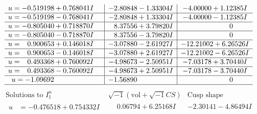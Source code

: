\documentclass[1p]{elsarticle_modified}
\theoremstyle{definition}
\newcommand{\I}{\sqrt{-1}}
\begin{document}
$$\begin{array}{c|c|c}
\begin{aligned}
u &= -0.519198 + 0.768041 I\end{aligned}
 & -2.80848 - 1.33304 I & -4.00000 + 1.12385 I \\ \hline\begin{aligned}
u &= -0.519198 - 0.768041 I\end{aligned}
 & -2.80848 + 1.33304 I & -4.00000 - 1.12385 I \\ \hline\begin{aligned}
u &= -0.805040 + 0.718870 I\end{aligned}
 & \phantom{-}8.37556 + 3.79820 I & \phantom{-0.000000 } 0 \\ \hline\begin{aligned}
u &= -0.805040 - 0.718870 I\end{aligned}
 & \phantom{-}8.37556 - 3.79820 I & \phantom{-0.000000 } 0 \\ \hline\begin{aligned}
u &= \phantom{-}0.900653 + 0.146018 I\end{aligned}
 & -3.07880 - 2.61927 I & -12.21002 + 6.26526 I \\ \hline\begin{aligned}
u &= \phantom{-}0.900653 - 0.146018 I\end{aligned}
 & -3.07880 + 2.61927 I & -12.21002 - 6.26526 I \\ \hline\begin{aligned}
u &= \phantom{-}0.493368 + 0.760092 I\end{aligned}
 & -4.98673 - 2.50951 I & -7.03178 + 3.70440 I \\ \hline\begin{aligned}
u &= \phantom{-}0.493368 - 0.760092 I\end{aligned}
 & -4.98673 + 2.50951 I & -7.03178 - 3.70440 I \\ \hline\begin{aligned}
u &= -1.09692\phantom{ +0.000000I}\end{aligned}
 & -1.56890\phantom{ +0.000000I} & \phantom{-0.000000 } 0\\
 \hline 
 \end{array}$$\newpage$$\begin{array}{c|c|c}  
\text{Solutions to }I^u_{1}& \I (\text{vol} + \sqrt{-1}CS) & \text{Cusp shape}\\
 \hline 
\begin{aligned}
u &= -0.476518 + 0.754332 I\end{aligned}
 & \phantom{-}0.06794 + 6.25168 I & -2.30141 - 4.86494 I \\ \hline\begin{aligned}

\end{aligned}
\end{array}$$
\end{document}
